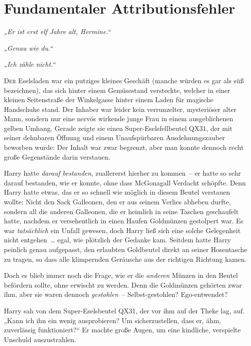 \chapter{Fundamentaler Attributionsfehler}

\noindent \emph{„Er ist erst elf Jahre alt, Hermine.“}

\noindent \emph{„Genau wie du.“}

\noindent \emph{„Ich zähle nicht.“}

\later

\lettrine{D}{er} Eselsladen war ein putziges kleines Geschäft (manche würden es gar als süß bezeichnen), das sich hinter einem Gemüsestand versteckte, welcher in einer kleinen Seitenstraße der Winkelgasse hinter einem Laden für magische Handschuhe stand. Der Inhaber war leider kein verrunzelter, mysteriöser alter Mann, sondern nur eine nervös wirkende junge Frau in einem ausgeblichenen gelben Umhang. Gerade zeigte sie einen Super-Eselsfellbeutel QX31, der mit seiner dehnbaren Öffnung und einem Unaufspürbaren Ausdehnungszauber beworben wurde: Der Inhalt war zwar begrenzt, aber man konnte dennoch recht große Gegenstände darin verstauen.

Harry hatte \emph{darauf bestanden}, zuallererst hierher zu kommen – er hatte so sehr darauf bestanden, wie er konnte, ohne dass McGonagall Verdacht schöpfte. Denn Harry hatte etwas, das er so schnell wie möglich in diesem Beutel verstauen wollte: Nicht den Sack Galleonen, den er aus seinem Verlies abheben durfte, sondern all die anderen Galleonen, die er heimlich in seine Taschen geschaufelt hatte, nachdem er versehentlich in einen Haufen Goldmünzen gestolpert war. Es war \emph{tatsächlich} ein Unfall gewesen, doch Harry ließ sich eine solche Gelegenheit nicht entgehen … egal, wie plötzlich der Gedanke kam. Seitdem hatte Harry peinlich genau aufgepasst, den erlaubten Goldbeutel direkt an seiner Hosentasche zu tragen, so dass alle klimpernden Geräusche aus der richtigen Richtung kamen.

Doch es blieb immer noch die Frage, wie er die \emph{anderen} Münzen in den Beutel befördern sollte, ohne erwischt zu werden. Denn die Goldmünzen gehörten zwar ihm, aber sie waren dennoch \emph{gestohlen} – Selbst-gestohlen? Ego-entwendet?

Harry sah von dem Super-Eselsbeutel QX31, der vor ihm auf der Theke lag, auf. „Kann ich ihn ein wenig ausprobieren? Um sicherzustellen, dass er, ähm, zuverlässig funktioniert?“ Er machte große Augen, um eine kindliche, verspielte Unschuld auszustrahlen.

